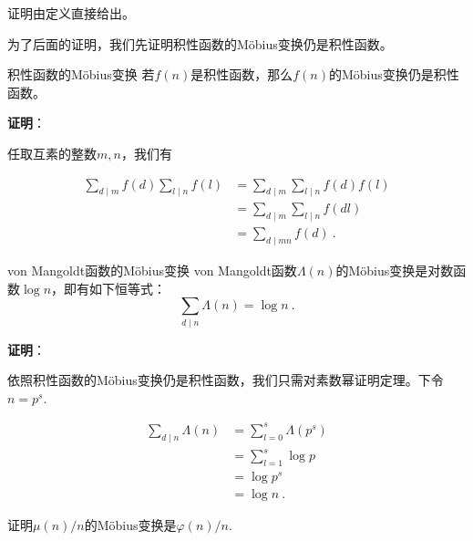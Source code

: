 证明由定义直接给出。

为了后面的证明，我们先证明积性函数的Möbius变换仍是积性函数。

\begin{theorem}{积性函数的Möbius变换}
若$f(n)$是积性函数，那么$f(n)$的Möbius变换仍是积性函数。
\end{theorem}

\textbf{证明}：

任取互素的整数$m,n$，我们有

\begin{equation}
\begin{aligned}
\sum_{d\mid m}f(d)\sum_{l\mid n}f(l)&=\sum_{d\mid m}\sum_{l\mid n}f(d)f(l)\\
&=\sum_{d\mid m}\sum_{l\mid n}f(dl)\\
&=\sum_{d\mid mn}f(d)~.
\end{aligned}
\end{equation}

\begin{theorem}{von Mangoldt函数的Möbius变换}\label{the_MbusF_4}
von Mangoldt函数$\Lambda(n)$的Möbius变换是对数函数$\log n$，即有如下恒等式：
\begin{equation}
\sum_{d\mid n}\Lambda(n)=\log{n}~.
\end{equation}
\end{theorem}

\textbf{证明}：

依照积性函数的Möbius变换仍是积性函数，我们只需对素数幂证明定理。下令$n=p^s$.

\begin{equation}
\begin{aligned}
\sum_{d\mid n}\Lambda(n)&=\sum_{l=0}^s \Lambda(p^s)\\
&=\sum_{l=1}^s \log p\\
&=\log p^s\\
&=\log n~.
\end{aligned}
\end{equation}

\begin{exercise}{}
证明$\mu(n)/n$的Möbius变换是$\varphi(n)/n$.
\end{exercise}

